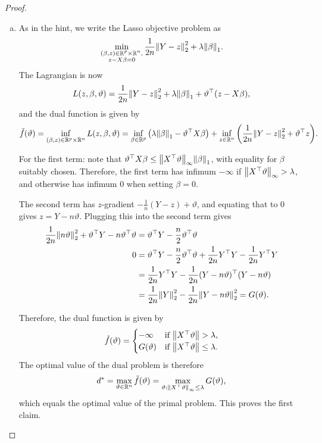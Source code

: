 \documentclass{article}
\theoremstyle{plain}
\theoremstyle{remark}
\renewcommand{\theta}{\vartheta}
\newcommand{\Bb}{\mathbb}
\newcommand{\RR}{\Bb R}
\newcommand{\T}{^\top} %
\DeclareMathOperator*{\argmin}{arg\,min}
\begin{document}
\begin{proof}
	\begin{enumerate}[(a)]
		\item 	As in the hint, we write the Lasso objective problem as
	\[
	\min_{\substack{(\beta, z) \in \RR^p \times \RR^n, \\ z - X\beta = 0}} \frac1{2n} \norm{Y- z}_2^2 + \lambda\norm{\beta}_1. 
	\]
	The Lagrangian is now
	\[
	L(z, \beta, \theta) = \frac1{2n} \norm{Y - z}_2^2 + \lambda\norm{\beta}_1 + \theta\T (z - X\beta),
	\]
	and the dual function is given by
	\[
	\tilde f(\theta) = \inf_{(\beta, z) \in \RR^p \times \RR^n} L(z, \beta, \theta) =  \inf_{\beta \in \RR^p} \qty(\lambda\norm{\beta}_1 - \theta\T X\beta) + \inf_{z \in \RR^n} \qty(\frac1{2n}\norm{Y- z}_2^2 + \theta\T z). 
	\]
	
		For the first term: note that $\theta\T X \beta \leq \norm{X\T\theta }_\infty \norm{\beta}_1$, with equality for $\beta$ suitably chosen. Therefore, the first term has infimum $-\infty$ if $\norm{X\T\theta}_\infty > \lambda$, and otherwise has infimum 0 when setting $\beta = 0$. 
		
		
	The second term has $z$-gradient $-\frac1n(Y - z) + \theta$, and equating that to 0 gives $z = Y - n\theta$. Plugging this into the second term gives
	\begin{align*}
	\frac1{2n} \norm{n\theta}_2^2 + \theta\T Y - n \theta\T\theta &= \theta\T Y - \frac n2 \theta\T \theta \\0
	&= \theta\T Y - \frac n2 \theta\T \theta + \frac1{2n} Y\T Y - \frac1{2n} Y\T Y \\
	&= \frac1{2n} Y\T Y - \frac1{2n} (Y - n\theta)\T (Y - n\theta) \\
	&= \frac1{2n} \norm{Y}_2^2 - \frac1{2n} \norm{Y - n\theta}_2^2 = G(\theta). 
	\end{align*}

Therefore, the dual function is given by
\[
\tilde f(\theta) = \begin{cases}
	-\infty &\text{if $\norm{X\T\theta} > \lambda$}, \\
	G(\theta) &\text{if $\norm{X\T\theta} \leq \lambda$}. 
\end{cases}
\]
The optimal value of the dual problem is therefore 
\[
d^* = \max_{\theta \in \RR^n} \tilde f(\theta) = \max_{\theta : \norm{X\T\theta}_\infty \leq \lambda} G(\theta), 
\]
which equals the optimal value of the primal problem. This proves the first claim. 

%


\end{enumerate}
\end{proof}
\end{document}
